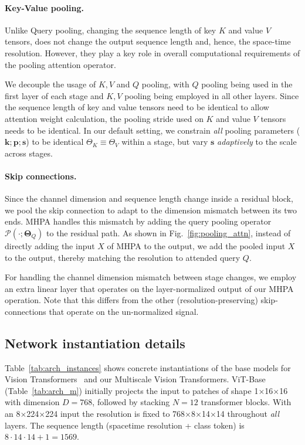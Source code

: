 \documentclass[10pt,twocolumn,letterpaper]{article}
\newcommand{\figref}[1]{Fig.~\ref{#1}}
\newcommand{\tblref}[1]{Table~\ref{#1}}
\def\x{$\times$}
\newcommand{\attnabbv}{MHPA\xspace}
\begin{document}
 \paragraph{Key-Value pooling.} Unlike Query pooling, changing the sequence length of key $K$ and value $V$ tensors, does not change the output sequence length and, hence, the space-time resolution. However, they play a key role in overall computational requirements of the pooling attention operator. 
 
 We decouple the usage of $K,V$ and $Q$ pooling, with $Q$ pooling being used in the first layer of each stage and $K,V$ pooling being employed in all other layers.
Since the sequence length of key and value tensors need to be identical to allow attention weight calculation, the pooling stride used on  $K$ and value $V$ tensors needs to be identical. In our default setting, we constrain \textit{all} pooling parameters ($\mathbf{k}; \mathbf{p}; \mathbf{s}$) to be identical \ie $\Theta_K \equiv \Theta_V$ within a stage, but vary  $\mathbf{s}$  \textit{adaptively} \wrt to the scale across stages.   

 \paragraph{Skip connections.} Since the channel dimension and sequence length change inside a residual block, we pool the skip connection to adapt to the dimension mismatch between its two ends. \attnabbv handles this mismatch by adding the query pooling operator $\mathcal{P}(\cdot ; \mathbf{\Theta}_Q)$ to the residual path. As shown in \figref{fig:pooling_attn}, instead of directly adding the input $X$ of MHPA to the output, we add the pooled input $X$ to the output, thereby matching the resolution to  attended query $Q$. 
 
 For handling the channel dimension mismatch between stage changes, we employ an extra linear layer that operates on the layer-normalized output of our \attnabbv operation. Note that this differs from the other (resolution-preserving) skip-connections that operate on the un-normalized signal. 

\subsection{Network instantiation details}

 \tblref{tab:arch_instances} shows concrete instantiations of the base models for Vision Transformers~\cite{dosovitskiy2020image} and our Multiscale Vision Transformers.  
 ViT-Base~\cite{dosovitskiy2020image} (\tblref{tab:arch_m}) initially projects the input to patches of shape 1\x16\x16 with dimension $D=768$, followed by stacking $N=12$ transformer blocks. With an 8\x224\x224 input  the resolution is fixed to 768\x8\x14\x14 throughout \textit{all} layers. The sequence length (spacetime resolution + class token) is $8 \cdot 14 \cdot 14 + 1 = 1569$.
 
\end{document}
